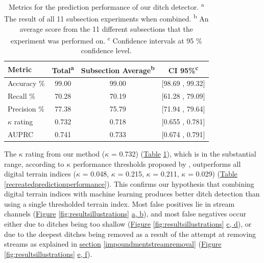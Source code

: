 \documentclass[11pt, review]{elsarticle} %
\begin{document}
\begin{table}[!htb]
\centering
    {\begin{tabular}{l|ccc}
        \textbf{Metric} & \textbf{Total}\textsuperscript{a} & \textbf{Subsection Average}\textsuperscript{b}& \textbf{CI 95\%}\textsuperscript{c} \\ 
        \hline
        Accuracy     \% & 99.00 & 99.00 & [98.69 , 99.32] \\
        Recall       \% & 70.28 & 70.19 & [61.28 , 79.09] \\
        Precision    \% & 77.38 & 75.79 & [71.94 , 79.64] \\
        $\kappa$ rating & 0.732 & 0.718 & [0.655 , 0.781] \\
        AUPRC           & 0.741 & 0.733 & [0.674 , 0.791] \\
        \hline
    \end{tabular}}
    \caption{Metrics for the prediction performance of our ditch detector. \newline
    \textsuperscript{a} The result of all 11 subsection experiments when combined. \newline
    \textsuperscript{b} An average score from the 11 different subsections that the experiment was performed on. \newline
    \textsuperscript{c} Confidence intervals at 95 \% confidence level.}
    \label{predictionperformance}
\end{table}

The $\kappa$ rating from our method ($\kappa$ = 0.732) (\hyperref[predictionperformance]{Table} \ref{predictionperformance}), which is in the substantial range, according to $\kappa$ performance thresholds proposed by \citet{kappaanalysis}, outperforms all digital terrain indices ($\kappa$ = 0.048, $\kappa$ = 0.215, $\kappa$ = 0.211, $\kappa$ = 0.029) (\hyperref[recreatedpredictionperformance]{Table} \ref{recreatedpredictionperformance}). This confirms our hypothesis that combining digital terrain indices with machine learning produces better ditch detection than using a single thresholded terrain index. Most false positives lie in stream channels (\hyperref[fig:resultsillustrations]{Figure} \ref{fig:resultsillustrations} \hyperref[fig:resultsillustrations]{a, b}), and most false negatives occur either due to ditches being too shallow (\hyperref[fig:resultsillustrations]{Figure} \ref{fig:resultsillustrations} \hyperref[fig:resultsillustrations]{c, d}), or due to the deepest ditches being removed as a result of the attempt at removing streams as explained in \hyperref[impoundmentstreamremoval]{section} \ref{impoundmentstreamremoval} (\hyperref[fig:resultsillustrations]{Figure} \ref{fig:resultsillustrations} \hyperref[fig:resultsillustrations]{e, f}).
\end{document}
